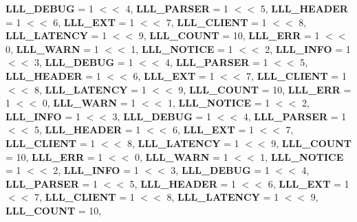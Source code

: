 \begin{DoxyCompactItemize}
{\bfseries L\+L\+L\+\_\+\+D\+E\+B\+UG} = 1 $<$$<$ 4, 
{\bfseries L\+L\+L\+\_\+\+P\+A\+R\+S\+ER} = 1 $<$$<$ 5, 
{\bfseries L\+L\+L\+\_\+\+H\+E\+A\+D\+ER} = 1 $<$$<$ 6, 
{\bfseries L\+L\+L\+\_\+\+E\+XT} = 1 $<$$<$ 7, 
\newline
{\bfseries L\+L\+L\+\_\+\+C\+L\+I\+E\+NT} = 1 $<$$<$ 8, 
{\bfseries L\+L\+L\+\_\+\+L\+A\+T\+E\+N\+CY} = 1 $<$$<$ 9, 
{\bfseries L\+L\+L\+\_\+\+C\+O\+U\+NT} = 10, 
{\bfseries L\+L\+L\+\_\+\+E\+RR} = 1 $<$$<$ 0, 
\newline
{\bfseries L\+L\+L\+\_\+\+W\+A\+RN} = 1 $<$$<$ 1, 
{\bfseries L\+L\+L\+\_\+\+N\+O\+T\+I\+CE} = 1 $<$$<$ 2, 
{\bfseries L\+L\+L\+\_\+\+I\+N\+FO} = 1 $<$$<$ 3, 
{\bfseries L\+L\+L\+\_\+\+D\+E\+B\+UG} = 1 $<$$<$ 4, 
\newline
{\bfseries L\+L\+L\+\_\+\+P\+A\+R\+S\+ER} = 1 $<$$<$ 5, 
{\bfseries L\+L\+L\+\_\+\+H\+E\+A\+D\+ER} = 1 $<$$<$ 6, 
{\bfseries L\+L\+L\+\_\+\+E\+XT} = 1 $<$$<$ 7, 
{\bfseries L\+L\+L\+\_\+\+C\+L\+I\+E\+NT} = 1 $<$$<$ 8, 
\newline
{\bfseries L\+L\+L\+\_\+\+L\+A\+T\+E\+N\+CY} = 1 $<$$<$ 9, 
{\bfseries L\+L\+L\+\_\+\+C\+O\+U\+NT} = 10, 
{\bfseries L\+L\+L\+\_\+\+E\+RR} = 1 $<$$<$ 0, 
{\bfseries L\+L\+L\+\_\+\+W\+A\+RN} = 1 $<$$<$ 1, 
\newline
{\bfseries L\+L\+L\+\_\+\+N\+O\+T\+I\+CE} = 1 $<$$<$ 2, 
{\bfseries L\+L\+L\+\_\+\+I\+N\+FO} = 1 $<$$<$ 3, 
{\bfseries L\+L\+L\+\_\+\+D\+E\+B\+UG} = 1 $<$$<$ 4, 
{\bfseries L\+L\+L\+\_\+\+P\+A\+R\+S\+ER} = 1 $<$$<$ 5, 
\newline
{\bfseries L\+L\+L\+\_\+\+H\+E\+A\+D\+ER} = 1 $<$$<$ 6, 
{\bfseries L\+L\+L\+\_\+\+E\+XT} = 1 $<$$<$ 7, 
{\bfseries L\+L\+L\+\_\+\+C\+L\+I\+E\+NT} = 1 $<$$<$ 8, 
{\bfseries L\+L\+L\+\_\+\+L\+A\+T\+E\+N\+CY} = 1 $<$$<$ 9, 
\newline
{\bfseries L\+L\+L\+\_\+\+C\+O\+U\+NT} = 10, 
{\bfseries L\+L\+L\+\_\+\+E\+RR} = 1 $<$$<$ 0, 
{\bfseries L\+L\+L\+\_\+\+W\+A\+RN} = 1 $<$$<$ 1, 
{\bfseries L\+L\+L\+\_\+\+N\+O\+T\+I\+CE} = 1 $<$$<$ 2, 
\newline
{\bfseries L\+L\+L\+\_\+\+I\+N\+FO} = 1 $<$$<$ 3, 
{\bfseries L\+L\+L\+\_\+\+D\+E\+B\+UG} = 1 $<$$<$ 4, 
{\bfseries L\+L\+L\+\_\+\+P\+A\+R\+S\+ER} = 1 $<$$<$ 5, 
{\bfseries L\+L\+L\+\_\+\+H\+E\+A\+D\+ER} = 1 $<$$<$ 6, 
\newline
{\bfseries L\+L\+L\+\_\+\+E\+XT} = 1 $<$$<$ 7, 
{\bfseries L\+L\+L\+\_\+\+C\+L\+I\+E\+NT} = 1 $<$$<$ 8, 
{\bfseries L\+L\+L\+\_\+\+L\+A\+T\+E\+N\+CY} = 1 $<$$<$ 9, 
{\bfseries L\+L\+L\+\_\+\+C\+O\+U\+NT} = 10, 
\newline

\end{DoxyCompactItemize}
